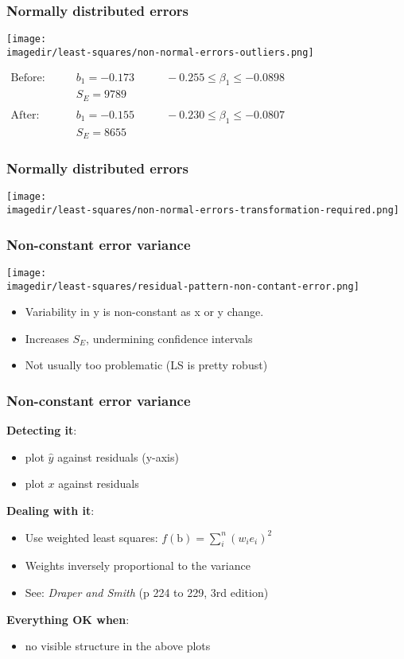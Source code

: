 \begin{frame}\frametitle{Normally distributed errors}
	\begin{center}
		\texttt{[image: \\imagedir/least-squares/non-normal-errors-outliers.png]}
	\end{center}
	$
	\begin{array}{rcccl}
		\text{Before}: \qquad & b_1 = -0.173 & \qquad -0.255 \leq \beta_1 \leq -0.0898 \\
		& S_E = 9789\\ \\
		\text{After}: \qquad & b_1 = -0.155 & \qquad -0.230 \leq \beta_1 \leq -0.0807 \\
		&S_E = 8655
	\end{array}
	$
\end{frame}

\begin{frame}\frametitle{Normally distributed errors}
	\begin{center}
		\texttt{[image: \\imagedir/least-squares/non-normal-errors-transformation-required.png]}
	\end{center}
\end{frame}

\begin{frame}\frametitle{Non-constant error variance}
	\begin{center}
		\texttt{[image: \\imagedir/least-squares/residual-pattern-non-contant-error.png]}
	\end{center}
	\begin{itemize}
		\item	Variability in y is non-constant as x or y change.
		\item	Increases $S_E$, undermining confidence intervals
		\item	Not usually too problematic (LS is pretty robust)
	\end{itemize}
\end{frame}

\begin{frame}\frametitle{Non-constant error variance}

	\textbf{Detecting it}:
	\begin{itemize}
		\item	plot $\hat{y}$ against residuals (y-axis)
		\item	plot $x$ against residuals
	\end{itemize}

	\textbf{Dealing with it}:
	\begin{itemize}
		\item	Use weighted least squares: $f(\mathrm{b}) = \sum_i^n{(w_ie_i)^2}$
		\item	Weights inversely proportional to the variance
		\item	See: \emph{Draper and Smith} (p 224 to 229, 3rd edition)
	\end{itemize}

	\textbf{Everything OK when}:
	\begin{itemize}
		\item	no visible structure in the above plots
	\end{itemize}
\end{frame}

